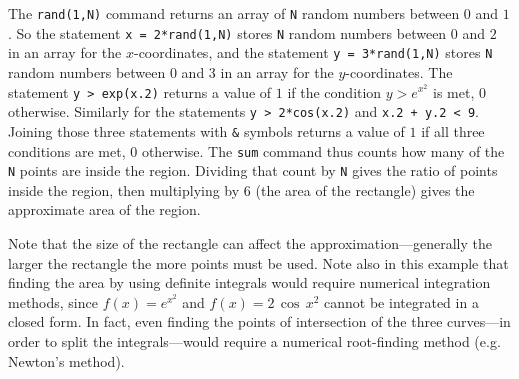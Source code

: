 \begin{exmp}
The \texttt{rand(1,N)} command returns an array of \texttt{N} random numbers
between $0$ and $1$. So the statement \texttt{x = 2*rand(1,N)} stores \texttt{N}
random numbers between $0$ and $2$ in an array for the $x$-coordinates, and the
statement \texttt{y = 3*rand(1,N)} stores \texttt{N} random numbers between $0$
and $3$ in an array for the $y$-coordinates. The statement
\texttt{y > exp(x.2)} returns a value of $1$ if the condition
$y > e^{x^2}$ is met, $0$ otherwise. Similarly for the statements
\texttt{y > 2*cos(x.2)} and
\texttt{x.2 + y.2 < 9}. Joining those three statements
with \texttt{\&} symbols returns a value of $1$ if all three conditions are met,
$0$ otherwise. The \texttt{sum} command thus counts how many
of the \texttt{N} points are inside the region. Dividing that count by
\texttt{N} gives the ratio of points inside the region, then multiplying
by $6$ (the area of the rectangle) gives the approximate area of the region.

Note that the size of the rectangle can affect the approximation---generally
the larger the rectangle the more points must be used. Note also in this example
that finding the area by using definite integrals would require numerical
integration methods, since $f(x)=e^{x^2}$ and $f(x)=2\,\cos\,x^2$ cannot be
integrated in a closed form. In fact, even finding the points of intersection of
the three curves---in order to split the integrals---would require a numerical
root-finding method (e.g. Newton's method).
\end{exmp}\vspace{-2mm}
\divider
\vspace{2mm}
\startexercises\label{sec8dot1}
